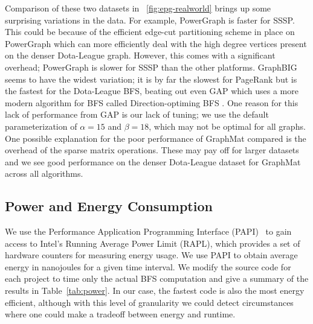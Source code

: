 \documentclass[conference]{IEEEtran}
\begin{document}
Comparison of these two datasets in \figurename~\ref{fig:epg-realworld} brings up some surprising variations in the data. For example, PowerGraph is faster for SSSP. This could be because of the efficient edge-cut partitioning scheme in place on PowerGraph which can more efficiently deal with the high degree vertices present on the denser Dota-League graph. However, this comes with a significant overhead; PowerGraph is slower for SSSP than the other platforms. GraphBIG seems to have the widest variation; it is by far the slowest for PageRank but is the fastest for the Dota-League BFS, beating out even GAP which uses a more modern algorithm for BFS called Direction-optiming BFS \cite{Beamer:2012:DOBFS}. One reason for this lack of performance from GAP is our lack of tuning; we use the default parameterization of $\alpha = 15$ and $\beta = 18$, which may not be optimal for all graphs. One possible explanation for the poor performance of GraphMat compared is the overhead of the sparse matrix operations. These may pay off for larger datasets and we see good performance on the denser Dota-League dataset for GraphMat across all algorithms.

\subsection{Power and Energy Consumption}
We use the Performance Application Programming Interface (PAPI)~\cite{Browne:2000:PAPI} to gain access to Intel's Running Average Power Limit (RAPL), which provides a set of hardware counters for measuring energy usage. We use PAPI to obtain average energy in nanojoules for a given time interval. We modify the source code for each project to time only the actual BFS computation and give a summary of the results in Table~\ref{tab:power}. In our case, the fastest code is also the most energy efficient, although with this level of granularity we could detect circumstances where one could make a tradeoff between energy and runtime.
\end{document}
